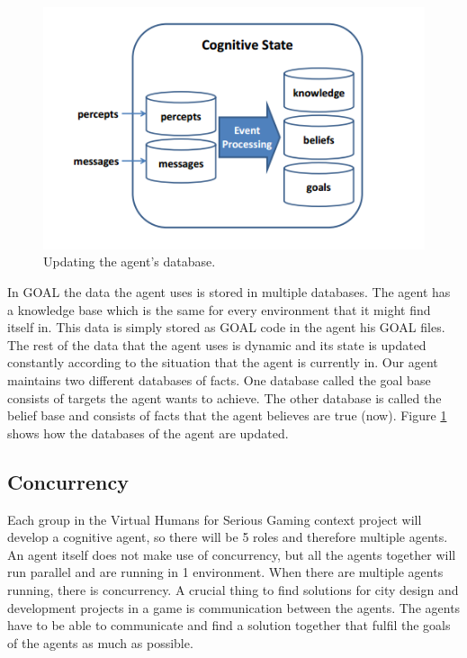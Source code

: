 \begin{figure}[h!]
  \includegraphics[width=\linewidth]{agentstate.png}
  \caption{Updating the agent's database.}
  \label{fig:agentstate1}
\end{figure}
In GOAL the data the agent uses is stored in multiple databases. The agent has a knowledge base which is the same for every environment that it might find itself in. This data is simply stored as GOAL code in the agent his GOAL files. The rest of the data that the agent uses is dynamic and its state is updated constantly according to the situation that the agent is currently in. Our agent maintains two different databases of facts. One database called the goal base consists of targets the agent wants to achieve. The other database is called the belief base and consists of facts that the agent believes are true (now). Figure \ref{fig:agentstate1} \cite{goal} shows how the databases of the agent are updated.



\newpage
\subsection{Concurrency}
Each group in the Virtual Humans for Serious Gaming context project will develop a cognitive agent, so there will be 5 roles and therefore multiple agents. An agent itself does not make use of concurrency, but all the agents together will run parallel and are running in 1 environment. When there are multiple agents running, there is concurrency. A crucial thing to find solutions for city design and development projects in a game is communication between the agents. The agents have to be able to communicate and find a solution together that fulfil the goals of the agents as much as possible.




